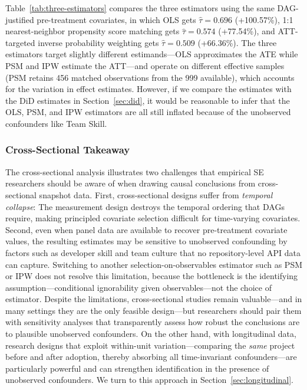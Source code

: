 Table~\ref{tab:three-estimators} compares the three estimators using the same DAG-justified pre-treatment covariates, in which OLS gets $\hat{\tau} = 0.696$ (+100.57\%), 1:1 nearest-neighbor propensity score matching gets $\hat{\tau} = 0.574$ (+77.54\%), and ATT-targeted inverse probability weighting gets $\hat{\tau} = 0.509$ (+66.36\%).
The three estimators target slightly different estimands---OLS approximates the ATE while PSM and IPW estimate the ATT---and operate on different effective samples (PSM retains 456 matched observations from the 999 available), which accounts for the variation in effect estimates.
However, if we compare the estimates with the DiD estimates in Section~\ref{sec:did}, it would be reasonable to infer that the OLS, PSM, and IPW estimators are all still inflated because of the unobserved confounders like Team Skill.

\subsubsection{Cross-Sectional Takeaway}
\label{sec:cross-sectional-takeaway}

The cross-sectional analysis illustrates two challenges that empirical SE researchers should be aware of when drawing causal conclusions from cross-sectional snapshot data.
First, cross-sectional designs suffer from \emph{temporal collapse}: The measurement design destroys the temporal ordering that DAGs require, making principled covariate selection difficult for time-varying covariates.
Second, even when panel data are available to recover pre-treatment covariate values, the resulting estimates may be sensitive to unobserved confounding by factors such as developer skill and team culture that no repository-level API data can capture.
Switching to another selection-on-observables estimator such as PSM or IPW does not resolve this limitation, because the bottleneck is the identifying assumption---conditional ignorability given observables---not the choice of estimator.
Despite the limitations, cross-sectional studies remain valuable---and in many settings they are the only feasible design---but researchers should pair them with sensitivity analyses that transparently assess how robust the conclusions are to plausible unobserved confounders.
On the other hand, with longitudinal data, research designs that exploit within-unit variation---comparing the \emph{same} project before and after adoption, thereby absorbing all time-invariant confounders---are particularly powerful and can strengthen identification in the presence of unobserved confounders.
We turn to this approach in Section~\ref{sec:longitudinal}.

